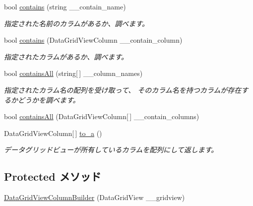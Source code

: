 \begin{DoxyCompactItemize}
bool \hyperlink{classlazurite_1_1pattern_1_1building_1_1_data_grid_view_column_builder_a57b48f39ff894e5a0dba10c01b740579}{contains} (string \_\-\_\-contain\_\-name)
\begin{DoxyCompactList}\small\item\em 指定された名前のカラムがあるか、調べます。 \item\end{DoxyCompactList}\item 
bool \hyperlink{classlazurite_1_1pattern_1_1building_1_1_data_grid_view_column_builder_a202d74ac180efeb371e78123006e8cef}{contains} (DataGridViewColumn \_\-\_\-contain\_\-column)
\begin{DoxyCompactList}\small\item\em 指定されたカラムがあるか、調べます。 \item\end{DoxyCompactList}\item 
bool \hyperlink{classlazurite_1_1pattern_1_1building_1_1_data_grid_view_column_builder_a126f1056d51b42976f2c6399e00a5c46}{containsAll} (string\mbox{[}$\,$\mbox{]} \_\-\_\-column\_\-names)
\begin{DoxyCompactList}\small\item\em 指定されたカラム名の配列を受け取って、 そのカラム名を持つカラムが存在するかどうかを調べます。 \item\end{DoxyCompactList}\item 
bool \hyperlink{classlazurite_1_1pattern_1_1building_1_1_data_grid_view_column_builder_aead7db29d56803d88fd85a2e02ded6b6}{containsAll} (DataGridViewColumn\mbox{[}$\,$\mbox{]} \_\-\_\-contain\_\-columns)
\item 
DataGridViewColumn\mbox{[}$\,$\mbox{]} \hyperlink{classlazurite_1_1pattern_1_1building_1_1_data_grid_view_column_builder_a11944b75c1f70aa64c630bc3e7121af4}{to\_\-a} ()
\begin{DoxyCompactList}\small\item\em データグリッドビューが所有しているカラムを配列にして返します。 \item\end{DoxyCompactList}\end{DoxyCompactItemize}
\subsection*{Protected メソッド}
\begin{DoxyCompactItemize}
\item 
\hyperlink{classlazurite_1_1pattern_1_1building_1_1_data_grid_view_column_builder_abb177bf444b5568f8c9444a3cc584d96}{DataGridViewColumnBuilder} (DataGridView \_\-\_\-gridview)
\end{DoxyCompactItemize}

